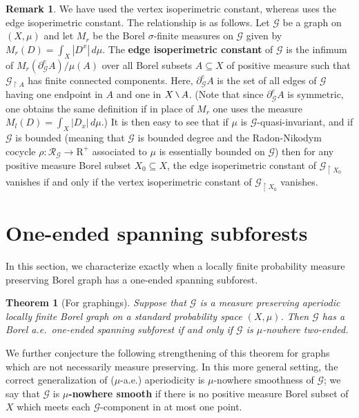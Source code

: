 \documentclass[11pt]{amsart}
\theoremstyle{definition}
\newtheorem{remark}[definition]{Remark}
\theoremstyle{plain}
\newtheorem{thm}[definition]{Theorem}
\newcommand{\<}{\langle}
\renewcommand{\>}{\rangle}
\newcommand{\ra}{\rightarrow}
\newcommand{\boundary}{\partial}
\newcommand{\R}{\bm{\mathrm{R}}}
\newcommand{\Ggraph}{\mathcal{G}}
\newcommand{\define}[1]{\textbf{#1}}
\newcommand{\pmp}{\text{p.m.p.}}
\newcommand\RR{\mathscr{R}}
\newcommand{\mysetminusD}{\hbox{\tikz{\draw[line width=0.6pt,line cap=round] (3pt,0) -- (0,6pt);}}}
\newcommand{\mysetminusT}{\mysetminusD}
\newcommand{\mysetminusS}{\hbox{\tikz{\draw[line width=0.45pt,line cap=round] (2pt,0) -- (0,4pt);}}}
\newcommand{\mysetminusSS}{\hbox{\tikz{\draw[line width=0.4pt,line cap=round] (1.5pt,0) -- (0,3pt);}}}
\newcommand{\mysetminus}{\mathbin{\mathchoice{\mysetminusD}{\mysetminusT}{\mysetminusS}{\mysetminusSS}}}%
\begin{document}
\begin{remark} We have used the vertex isoperimetric constant, whereas
\cite{El12} uses the edge isoperimetric constant. The relationship is as follows. Let ${\Ggraph}$ be a graph on $(X,\mu )$ and let $M_r$ be the
Borel $\sigma$-finite measures on ${\Ggraph}$ given by $M_r(D)= \int _X
|D^x| \, d\mu$. The \define{edge isoperimetric constant} of ${\Ggraph}$ is the infimum of $M_r (\boundary _{\Ggraph}^{e} A) / \mu(A)$ over all Borel subsets $A \subseteq X$ of positive measure such that ${\Ggraph}_{\restriction A}$ has finite connected components. Here, $\boundary _{\Ggraph} ^e A$ is the set of all edges of ${\Ggraph}$ having one endpoint in $A$ and one in $X\mysetminus A$. (Note that since $\boundary _{\Ggraph} ^e A$ is symmetric, one obtains the same definition if in place of $M_r$ one uses the measure $M_l(D)=\int _X |D_x|\, d\mu$.) It is then easy to see that if $\mu$ is ${\Ggraph}$-quasi-invariant, and if ${\Ggraph}$ is bounded (meaning that ${\Ggraph}$ is bounded degree and the Radon-Nikodym cocycle $\rho : \RR_{\Ggraph} \ra \R ^+$ associated to $\mu$ is essentially bounded on ${\Ggraph}$) then for any positive measure Borel subset $X_0\subseteq X$, the edge isoperimetric constant of ${\Ggraph}_{\restriction X_0}$ vanishes if and only if the vertex isoperimetric constant of ${\Ggraph}_{\restriction X_0}$ vanishes.
\end{remark}


\section{One-ended spanning subforests}

In this section, we characterize exactly when a locally finite probability
measure preserving Borel graph has a one-ended spanning subforest.

\begin{thm}[For \pmp{} graphings] \label{thm:pmp}
  Suppose that ${\Ggraph}$ is a measure preserving aperiodic
  locally finite
  Borel graph on a standard probability space $(X,\mu )$. Then ${\Ggraph}$ has a Borel
  a.e.\ one-ended spanning subforest if and only if ${\Ggraph}$ is $\mu$-nowhere
  two-ended.
\end{thm}

We further conjecture the following strengthening of this theorem for
graphs which are not necessarily measure preserving. In this more general setting, the correct generalization of ($\mu$-a.e.) aperiodicity is $\mu$-nowhere smoothness of $\Ggraph$; we say that $\Ggraph$ is \define{$\mu$-nowhere smooth} if there is no positive measure Borel subset of $X$ which meets each $\Ggraph$-component in at most one point.
\end{document}
